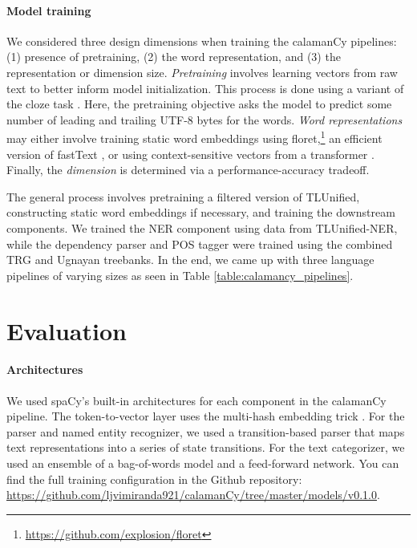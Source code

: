 \documentclass[11pt]{article}
\begin{document}
\paragraph*{Model training}

We considered three design dimensions when training the calamanCy pipelines: (1) presence of pretraining, (2) the word representation, and (3) the representation or dimension size.
\textit{Pretraining} involves learning vectors from raw text to better inform model initialization.
This process is done using a variant of the cloze task \citep{Devlin2019BERTPO}.
Here, the pretraining objective asks the model to predict some number of leading and trailing UTF-8 bytes for the words.
\textit{Word representations} may either involve training static word embeddings using floret,\footnote[3]{\url{https://github.com/explosion/floret}} an efficient version of fastText \citep{Bojanowski2016EnrichingWV}, or using context-sensitive vectors from a transformer \citep{Vaswani2017AttentionIA}.
Finally, the \textit{dimension} is determined via a performance-accuracy tradeoff.


The general process involves pretraining a filtered version of TLUnified, constructing static word embeddings if necessary, and training the downstream components.
We trained the NER component using data from TLUnified-NER, while the dependency parser and POS tagger were trained using the combined TRG and Ugnayan treebanks.
In the end, we came up with three language pipelines of varying sizes as seen in Table \ref{table:calamancy_pipelines}.

\section{Evaluation}



\paragraph*{Architectures}

We used spaCy's built-in architectures for each component in the calamanCy pipeline.
The token-to-vector layer uses the multi-hash embedding trick \citep{Miranda2022MultiHE}.
For the parser and named entity recognizer, we used a transition-based parser that maps text representations into a series of state transitions.
For the text categorizer, we used an ensemble of a bag-of-words model and a feed-forward network.
You can find the full training configuration in the Github repository: \url{https://github.com/ljvimiranda921/calamanCy/tree/master/models/v0.1.0}.
\end{document}
